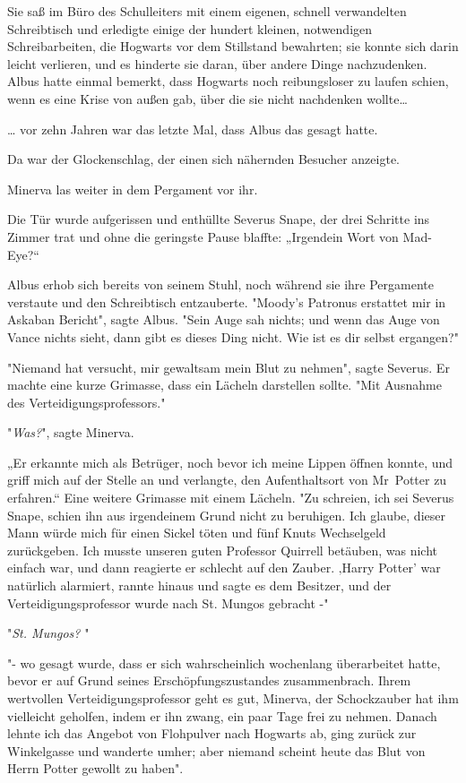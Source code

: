 {Sie saß im Büro des Schulleiters mit einem eigenen, schnell verwandelten Schreibtisch und erledigte einige der hundert kleinen, notwendigen Schreibarbeiten, die Hogwarts vor dem Stillstand bewahrten; sie konnte sich darin leicht verlieren, und es hinderte sie daran, über andere Dinge nachzudenken. Albus hatte einmal bemerkt, dass Hogwarts noch reibungsloser zu laufen schien, wenn es eine Krise von außen gab, über die sie nicht nachdenken wollte…

… vor zehn Jahren war das letzte Mal, dass Albus das gesagt hatte.

Da war der Glockenschlag, der einen sich nähernden Besucher anzeigte.

Minerva las weiter in dem Pergament vor ihr.

Die Tür wurde aufgerissen und enthüllte Severus Snape, der drei Schritte ins Zimmer trat und ohne die geringste Pause blaffte: „Irgendein Wort von Mad-Eye?“

Albus erhob sich bereits von seinem Stuhl, noch während sie ihre Pergamente verstaute und den Schreibtisch entzauberte. "Moody's Patronus erstattet mir in Askaban Bericht", sagte Albus. "Sein Auge sah nichts; und wenn das Auge von Vance nichts sieht, dann gibt es dieses Ding nicht. Wie ist es dir selbst ergangen?"

"Niemand hat versucht, mir gewaltsam mein Blut zu nehmen", sagte Severus. Er machte eine kurze Grimasse, dass ein Lächeln darstellen sollte. "Mit Ausnahme des Verteidigungsprofessors."

"\emph{Was?}", sagte Minerva.

„Er erkannte mich als Betrüger, noch bevor ich meine Lippen öffnen konnte, und griff mich auf der Stelle an und verlangte, den Aufenthaltsort von Mr~Potter zu erfahren.“ Eine weitere Grimasse mit einem Lächeln. "Zu schreien, ich sei Severus Snape, schien ihn aus irgendeinem Grund nicht zu beruhigen. Ich glaube, dieser Mann würde mich für einen Sickel töten und fünf Knuts Wechselgeld zurückgeben. Ich musste unseren guten Professor Quirrell betäuben, was nicht einfach war, und dann reagierte er schlecht auf den Zauber. ‚Harry Potter' war natürlich alarmiert, rannte hinaus und sagte es dem Besitzer, und der Verteidigungsprofessor wurde nach St. Mungos gebracht -"

"\emph{St. Mungos?} "

"- wo gesagt wurde, dass er sich wahrscheinlich wochenlang überarbeitet hatte, bevor er auf Grund seines Erschöpfungszustandes zusammenbrach. Ihrem wertvollen Verteidigungsprofessor geht es gut, Minerva, der Schockzauber hat ihm vielleicht geholfen, indem er ihn zwang, ein paar Tage frei zu nehmen. Danach lehnte ich das Angebot von Flohpulver nach Hogwarts ab, ging zurück zur Winkelgasse und wanderte umher; aber niemand scheint heute das Blut von Herrn Potter gewollt zu haben".

}
